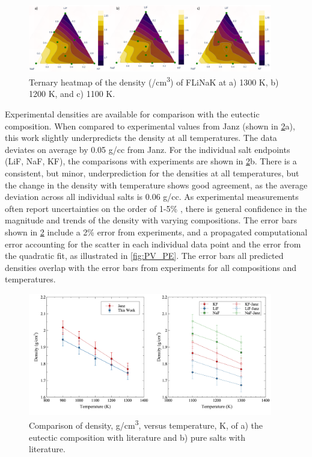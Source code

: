 \documentclass[preprint,12pt]{elsarticle}
\begin{document}
\begin{figure}[h!]
    \centering
    \includegraphics[width=0.95\textwidth]{densityTernary_withScatter.png}
    \caption{Ternary heatmap of the density (/cm\textsuperscript{3}) of FLiNaK at a) 1300 K, b) 1200 K, and c) 1100 K.}
    \label{fig:densityHeat}
\end{figure}


Experimental densities are available for comparison with the eutectic composition. When compared to experimental values from Janz \cite{Janz1981} (shown in \cref{fig:densityCompare}a), this work slightly underpredicts the density at all temperatures. The data deviates on average by 0.05 g/cc from Janz. %
For the individual salt endpoints (LiF, NaF, KF), the comparisons with experiments are shown in \cref{fig:densityCompare}b. There is a consistent, but minor, underprediction for the densities at all temperatures, but the change in the density with temperature shows good agreement, as the average deviation across all individual salts is 0.06 g/cc. As experimental measurements often report uncertainties on the order of 1-5\% \cite{JanzSaltProp}, there is general confidence in the magnitude and trends of the density with varying compositions. The error bars shown in \cref{fig:densityCompare} include a 2\% error from experiments, and a propagated computational error accounting for the scatter in each individual data point and the error from the quadratic fit, as illustrated in \cref{fig:PV_PE}. The error bars all predicted densities overlap with the error bars from experiments for all compositions and temperatures. 

\begin{figure}[!h]
\centering
\includegraphics[width=0.95\textwidth]{fig5.jpg}
\caption{Comparison of density, g/cm\textsuperscript{3}, versus temperature, K, of a) the eutectic composition with literature\cite{Janz1981} and b) pure salts with literature\cite{JanzSaltProp}.}
\label{fig:densityCompare}
\end{figure}
\end{document}
